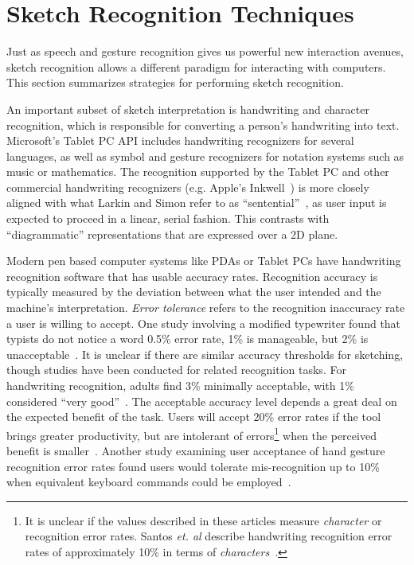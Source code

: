 \newpage
\chapter{Sketch Recognition Techniques}
\label{sec:recognition}

Just as speech and gesture recognition gives us powerful new
interaction avenues, sketch recognition allows a different paradigm
for interacting with computers. This section summarizes strategies for
performing sketch recognition.

An important subset of sketch interpretation is handwriting and
character recognition, which is responsible for converting a person's
handwriting into text. Microsoft's Tablet PC API includes handwriting
recognizers for several languages, as well as symbol and gesture
recognizers for notation systems such as music or mathematics. The
recognition supported by the Tablet PC and other commercial
handwriting recognizers (e.g. Apple's Inkwell~\cite{apple-inkwell}) is
more closely aligned with what Larkin and Simon refer to as
``sentential''~\cite{larkin-diagrams}, as user input is expected to
proceed in a linear, serial fashion. This contrasts with
``diagrammatic'' representations that are expressed over a 2D plane.

Modern pen based computer systems like PDAs or Tablet PCs have
handwriting recognition software that has usable accuracy
rates. Recognition accuracy is typically measured by the deviation
between what the user intended and the machine's
interpretation. \textit{Error tolerance} refers to the recognition
inaccuracy rate a user is willing to accept. One study involving a
modified typewriter found that typists do not notice a word 0.5\%
error rate, 1\% is manageable, but 2\% is
unacceptable~\cite[p. 79]{cole-survey}. It is unclear if there are
similar accuracy thresholds for sketching, though studies have been
conducted for related recognition tasks. For handwriting recognition,
adults find 3\% minimally acceptable, with 1\% considered ``very
good''~\cite{lalomia-recognition-accuracy}. The acceptable accuracy
level depends a great deal on the expected benefit of the task. Users
will accept 20\% error rates if the tool brings greater productivity,
but are intolerant of errors\footnote{It is unclear if the values
described in these articles measure \textit{character} or 
recognition error rates. Santos \textit{et. al} describe handwriting
recognition error rates of approximately 10\% in terms
of \textit{characters}~\cite{santos-handwriting-recognition}.} when
the perceived benefit is
smaller~\cite{frankish-recognition-tolerance}. Another study examining
user acceptance of hand gesture recognition error rates found users
would tolerate mis-recognition up to 10\% when equivalent keyboard
commands could be employed~\cite{karam-gesture-recognition}.

